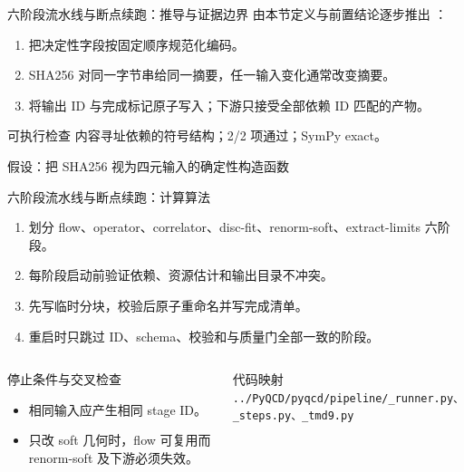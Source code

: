 \begin{frame}[t]{六阶段流水线与断点续跑：推导与证据边界}
\footnotesize
{}\quad 由本节定义与前置结论逐步推出 ：
\begin{enumerate}
\item 把决定性字段按固定顺序规范化编码。
\item SHA256 对同一字节串给同一摘要，任一输入变化通常改变摘要。
\item 将输出 ID 与完成标记原子写入；下游只接受全部依赖 ID 匹配的产物。
\end{enumerate}\begin{block}{可执行检查}
\quad 内容寻址依赖的符号结构；2/2 项通过；SymPy exact。
\par\scriptsize 假设：把 SHA256 视为四元输入的确定性构造函数
\end{block}
\end{frame}

\begin{frame}[t]{六阶段流水线与断点续跑：计算算法}
\footnotesize
{}\begin{enumerate}
\item 划分 flow、operator、correlator、disc-fit、renorm-soft、extract-limits 六阶段。
\item 每阶段启动前验证依赖、资源估计和输出目录不冲突。
\item 先写临时分块，校验后原子重命名并写完成清单。
\item 重启时只跳过 ID、schema、校验和与质量门全部一致的阶段。
\end{enumerate}\begin{columns}[T,onlytextwidth]
\begin{block}{停止条件与交叉检查}\scriptsize\begin{itemize}
\item[\CheckMark] 相同输入应产生相同 stage ID。
\item[\CheckMark] 只改 soft 几何时，flow 可复用而 renorm-soft 及下游必须失效。
\end{itemize}\end{block}
\begin{block}{代码映射}
\scriptsize \texttt{.\allowbreak{}.\allowbreak{}/\allowbreak{}PyQCD/\allowbreak{}pyqcd/\allowbreak{}pipeline/\allowbreak{}\_\allowbreak{}runner.\allowbreak{}py、\_\allowbreak{}steps.\allowbreak{}py、\_\allowbreak{}tmd9.\allowbreak{}py}
\end{block}\end{columns}\end{frame}

